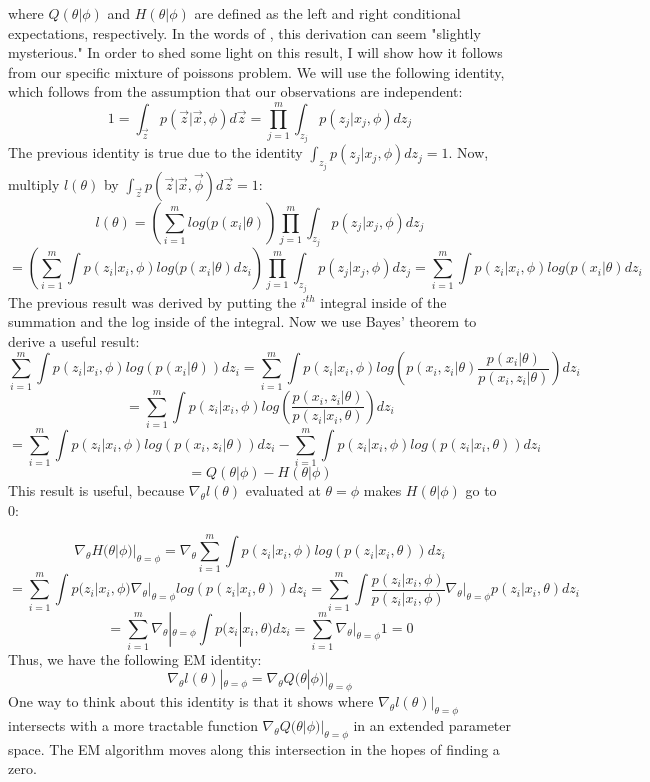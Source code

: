 \documentclass[letter,12pt]{article}
\begin{document}
where $Q(\theta|\phi)$ and $H(\theta|\phi)$ are defined as the left and right conditional expectations, respectively.  In the words of \cite{lange1995a}, this derivation can seem "slightly mysterious."  In order to shed some light on this result, I will show how it follows from our specific mixture of poissons problem.  We will use the following identity, which follows from the assumption that our observations are independent:
\[
1 = \int_{\vec{z}}p(\vec{z}|\vec{x},\phi)d\vec{z}
= \prod_{j=1}^{m}\int_{z_j}p(z_j|x_j,\phi)dz_j
\]
The previous identity is true due to the identity $\int_{z_j}p(z_j|x_j,\phi)dz_j=1$.  Now, multiply $l(\theta)$ by $\int_{\vec{z}}p(\vec{z}|\vec{x},\vec{\phi})d\vec{z}=1$:
\[
l(\theta)
= \left( \sum_{i=1}^{m} log(p(x_i|\theta)\right)
\prod_{j=1}^{m}\int_{z_j}p(z_j|x_j,\phi)dz_j
\]
\[
= \left( \sum_{i=1}^{m} \int p(z_i|x_i,\phi)log(p(x_i|\theta)dz_i\right)
\prod_{j=1}^{m}\int_{z_j}p(z_j|x_j,\phi)dz_j
=\sum_{i=1}^{m} \int p(z_i|x_i,\phi)log(p(x_i|\theta)dz_i
\]
The previous result was derived by putting the $i^{th}$ integral inside of the summation and the log inside of the integral.  Now we use Bayes' theorem to derive a useful result:
\[
\sum_{i=1}^{m} \int p(z_i|x_i,\phi)log(p(x_i|\theta))dz_i
= \sum_{i=1}^{m} \int p(z_i|x_i,\phi) log \left(p(x_i,z_i|\theta)\frac{p(x_i|\theta)}{p(x_i,z_i|\theta)}\right) dz_i
\]
\[
=
\sum_{i=1}^{m} \int p(z_i|x_i,\phi) log \left(\frac{p(x_i,z_i|\theta)}{p(z_i|x_i,\theta)}\right) dz_i
\]
\[
=
\sum_{i=1}^{m} \int p(z_i|x_i,\phi) log \left(p(x_i,z_i|\theta)\right) dz_i
-
\sum_{i=1}^{m} \int p(z_i|x_i,\phi) log \left(p(z_i|x_i,\theta)\right) dz_i
\] 
\[
=Q(\theta|\phi)
-H(\theta|\phi)
\]
This result is useful, because $\nabla_{\theta}l(\theta)$ evaluated at $\theta = \phi$ makes $H(\theta|\phi)$ go to 0: 

\[
\nabla_{\theta}H(\theta|\phi)|_{\theta = \phi}
=
\nabla_{\theta}\sum_{i=1}^{m} \int p(z_i|x_i,\phi) log \left(p(z_i|x_i,\theta)\right) dz_i
\]
\[
=
\sum_{i=1}^{m} 
\int p(z_i|x_i,\phi) 
\nabla_{\theta}|_{\theta = \phi}
log \left(p(z_i|x_i,\theta)\right) dz_i
=
\sum_{i=1}^{m} 
\int \dfrac{p(z_i|x_i,\phi)}{p(z_i|x_i,\phi)} 
\nabla_{\theta}|_{\theta = \phi}
p(z_i|x_i,\theta) dz_i
\]
\[
=
\sum_{i=1}^{m} 
\nabla_{\theta}|_{\theta = \phi}
\int 
p(z_i|x_i,\theta) dz_i
=
\sum_{i=1}^{m} 
\nabla_{\theta}|_{\theta = \phi}
1
=0
\]
Thus, we have the following EM identity:
\begin{equation} \label{eq:dl_is_dq}
\nabla_{\theta}l(\theta)|_{\theta = \phi}
=
\nabla_{\theta}Q(\theta|\phi)|_{\theta = \phi}
\end{equation}
One way to think about this identity is that it shows where $\nabla_{\theta}l(\theta)|_{\theta = \phi}$ intersects with a more tractable function $\nabla_{\theta}Q(\theta|\phi)|_{\theta = \phi}$ in an extended parameter space.  The EM algorithm moves along this intersection in the hopes of finding a zero.
\end{document}
